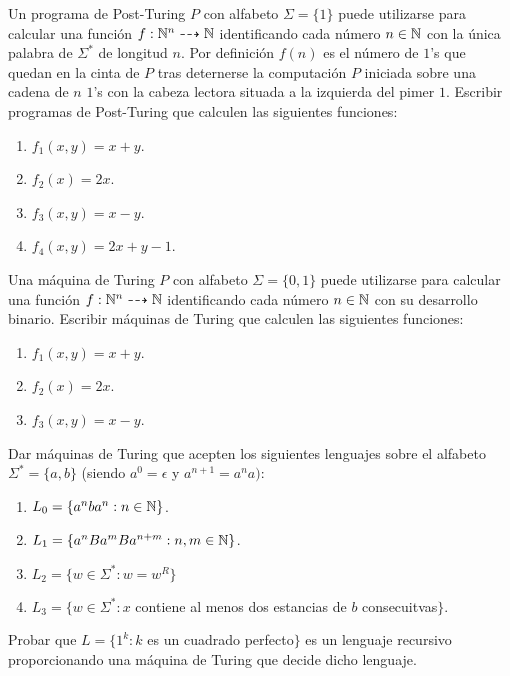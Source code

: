 \documentclass[twoside]{article}
\begin{document}
\begin{ejercicio}{4}
Un programa de Post-Turing $P$ con alfabeto $Σ=\{1\}$ puede utilizarse para calcular una función $f : \mathbb{N}^n \dashrightarrow \mathbb{N}$ identificando cada número $n \in \mathbb{N}$ con la única palabra de $Σ^*$ de longitud $n$. Por definición $f(n)$ es el número de $1$'s que quedan en la cinta de $P$ tras deternerse la computación $P$ iniciada sobre una cadena de $n$ $1$'s con la cabeza lectora situada a la izquierda del pimer $1$. Escribir programas de Post-Turing que calculen las siguientes funciones:
\begin{enumerate}
	\item $f_1(x,y)=x+y$.
	\item $f_2(x)=2x$.
	\item $f_3(x,y)=x-y$.
	\item $f_4(x,y)=2x+y-1$.
\end{enumerate}
\end{ejercicio}

\newpage

\begin{ejercicio}{5}
Una máquina de Turing $P$ con alfabeto $Σ=\{0,1\}$ puede utilizarse para calcular una función $f : \mathbb{N}^n \dashrightarrow \mathbb{N}$ identificando cada número $n \in \mathbb{N}$ con su desarrollo binario. Escribir máquinas de Turing que calculen las siguientes funciones:
\begin{enumerate}
	\item $f_1(x,y)=x+y$.
	\item $f_2(x)=2x$.
	\item $f_3(x,y)=x-y$.
\end{enumerate}
\end{ejercicio}

\newpage

\begin{ejercicio}{6}
Dar máquinas de Turing que acepten los siguientes lenguajes sobre el alfabeto $Σ^*=\{a,b\}$ (siendo $a^0=ϵ$ y $a^{n+1}=a^na)$:
\begin{enumerate}
	\item $L_0 = \{a^nba^n : n\in\mathbb{N}\}$.
	\item $L_1=\{a^nBa^mBa^{n+m} : n,m\in\mathbb{N}\}$.
	\item $L_2=\{w\in Σ^* : w=w^R\}$
	\item $L_3=\{w\in Σ^*: x$ contiene al menos dos estancias de $b$ consecuitvas$\}$.
\end{enumerate}
\end{ejercicio}

\newpage

\begin{ejercicio}{7}
Probar que $L=\{1^k : k$ es un cuadrado perfecto$\}$ es un lenguaje recursivo proporcionando una máquina de Turing que decide dicho lenguaje.
\end{ejercicio}
\end{document}
